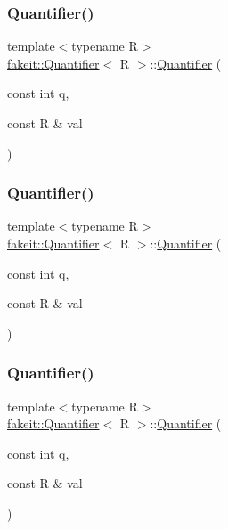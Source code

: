 \subsubsection{\texorpdfstring{Quantifier()}{Quantifier()}\hspace{0.1cm}{\footnotesize\ttfamily [1/9]}}
{\footnotesize\ttfamily template$<$typename R$>$ \\
\mbox{\hyperlink{structfakeit_1_1Quantifier}{fakeit\+::\+Quantifier}}$<$ R $>$\+::\mbox{\hyperlink{structfakeit_1_1Quantifier}{Quantifier}} (\begin{DoxyParamCaption}\item[{const int}]{q,  }\item[{const R \&}]{val }\end{DoxyParamCaption})\hspace{0.3cm}{\ttfamily [inline]}}

\mbox{\label{structfakeit_1_1Quantifier_a9eb6f158c8d585a00e03d1fdcde24af3}} 
\subsubsection{\texorpdfstring{Quantifier()}{Quantifier()}\hspace{0.1cm}{\footnotesize\ttfamily [2/9]}}
{\footnotesize\ttfamily template$<$typename R$>$ \\
\mbox{\hyperlink{structfakeit_1_1Quantifier}{fakeit\+::\+Quantifier}}$<$ R $>$\+::\mbox{\hyperlink{structfakeit_1_1Quantifier}{Quantifier}} (\begin{DoxyParamCaption}\item[{const int}]{q,  }\item[{const R \&}]{val }\end{DoxyParamCaption})\hspace{0.3cm}{\ttfamily [inline]}}

\mbox{\label{structfakeit_1_1Quantifier_a9eb6f158c8d585a00e03d1fdcde24af3}} 
\subsubsection{\texorpdfstring{Quantifier()}{Quantifier()}\hspace{0.1cm}{\footnotesize\ttfamily [3/9]}}
{\footnotesize\ttfamily template$<$typename R$>$ \\
\mbox{\hyperlink{structfakeit_1_1Quantifier}{fakeit\+::\+Quantifier}}$<$ R $>$\+::\mbox{\hyperlink{structfakeit_1_1Quantifier}{Quantifier}} (\begin{DoxyParamCaption}\item[{const int}]{q,  }\item[{const R \&}]{val }\end{DoxyParamCaption})\hspace{0.3cm}{\ttfamily [inline]}}


